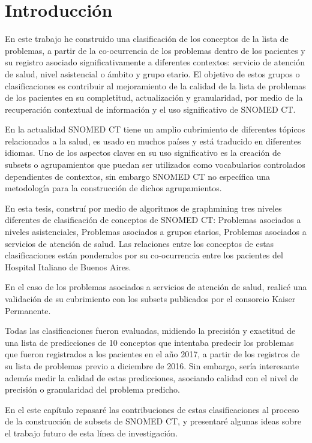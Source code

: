 \section{Introducción}
En este trabajo he construido una clasificación de los conceptos de la lista de problemas, a partir de la co-ocurrencia de los problemas dentro de los pacientes y su registro asociado significativamente a diferentes contextos: servicio de atención de salud, nivel asistencial o ámbito y grupo etario. El objetivo de estos grupos o clasificaciones es contribuir al mejoramiento de la calidad de la lista de problemas de los pacientes en su completitud, actualización y granularidad, por medio de la recuperación contextual de información y el uso significativo de SNOMED CT.

En la actualidad SNOMED CT tiene un amplio cubrimiento de diferentes tópicos relacionados a la salud, es usado en muchos países y está traducido en diferentes idiomas. Uno de los aspectos claves en su uso significativo es la creación de subsets o agrupamientos que puedan ser utilizados como vocabularios controlados dependientes de contextos, sin embargo SNOMED CT no específica una metodología para la construcción de dichos agrupamientos.

En esta tesis, construí por medio de algoritmos de graphmining tres niveles diferentes de clasificación de conceptos de SNOMED CT: Problemas asociados a niveles asistenciales, Problemas asociados a grupos etarios, Problemas asociados a servicios de atención de salud. Las relaciones entre los conceptos de estas clasificaciones están ponderados por su co-ocurrencia entre los pacientes del Hospital Italiano de Buenos Aires.

En el caso de los problemas asociados a servicios de atención de salud, realicé una validación de su cubrimiento con los subsets publicados por el consorcio Kaiser Permanente.

Todas las clasificaciones fueron evaluadas, midiendo la precisión y exactitud de una lista de predicciones de 10 conceptos que intentaba predecir los problemas que fueron registrados a los pacientes en el año 2017, a partir de los registros de su lista de problemas previo a diciembre de 2016. Sin embargo, sería interesante además medir la calidad de estas predicciones, asociando calidad con el nivel de precisión o granularidad del problema predicho.

En el este capítulo repasaré las contribuciones de estas clasificaciones al proceso de la construcción de subsets de SNOMED CT, y presentaré algunas ideas sobre el trabajo futuro de esta línea de investigación.


